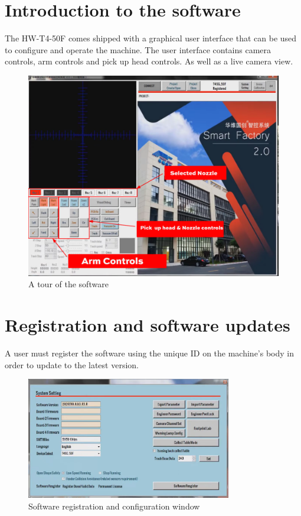 \documentclass[a4paper,10pt]{report}
\begin{document}
\section{Introduction to the software}
The HW-T4-50F comes shipped with a graphical user interface that can be used to configure and operate the machine. The user interface contains camera controls, arm controls and pick up head controls. As well as a live camera view.
\begin{figure}[!htb]
 \centering
 \includegraphics[width=1\textwidth]{images/scrot1.png}
 \caption{A tour of the software}
\end{figure}
\newpage
\section{Registration and software updates}
A user must register the software using the unique ID on the machine's body in order to update to the latest version.
\begin{figure}[!htb]
 \centering
 \includegraphics[width=0.8\textwidth]{images/scrot2.png}
 \caption{Software registration and configuration window}
\end{figure}
\end{document}
